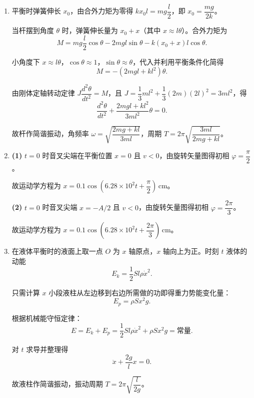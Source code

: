 \documentclass{article}
\begin{document}
\begin{enumerate}
联立以上方程，消去 $T_1$、$T_2$ 和 $\alpha$，利用平衡条件 $mg=kl$ 化简得
\[
\dfrac{d^2x}{dt^2}+\dfrac{k}{m+M/2}x=0.
\]

故系统作简谐振动，振动圆频率 $\omega=\sqrt{\dfrac{k}{m+M/2}}$。

\item 平衡时弹簧伸长 $x_0$，由合外力矩为零得 $kx_0 l=mg\dfrac{l}{2}$，即 $x_0=\dfrac{mg}{2k}$。

当杆摆到角度 $\theta$ 时，弹簧伸长量为 $x_0+x$（其中 $x\approx l\theta$）。合外力矩为
\[
M = mg\dfrac{l}{2}\cos\theta - 2mgl\sin\theta - k(x_0+x)l\cos\theta.
\]

小角度下 $x\approx l\theta$，$\cos\theta\approx 1$，$\sin\theta\approx\theta$，代入并利用平衡条件化简得
\[
M=-(2mgl+kl^2)\theta.
\]

由刚体定轴转动定律 $J\dfrac{d^2\theta}{dt^2}=M$，且 $J=\dfrac{1}{3}ml^2+\dfrac{1}{3}(2m)(2l)^2=3ml^2$，得
\[
\dfrac{d^2\theta}{dt^2}+\dfrac{2mgl+kl^2}{3ml^2}\theta=0.
\]

故杆作简谐振动，角频率 $\omega=\sqrt{\dfrac{2mg+kl}{3ml}}$，周期 $T=2\pi\sqrt{\dfrac{3ml}{2mg+kl}}$。

\item \textbf{(1)} $t=0$ 时音叉尖端在平衡位置 $x=0$ 且 $v<0$，由旋转矢量图得初相 $\varphi=\dfrac{\pi}{2}$。

故运动学方程为 $x=0.1\cos\left(6.28\times 10^2 t+\dfrac{\pi}{2}\right)\,\mathrm{cm}$。

\textbf{(2)} $t=0$ 时音叉尖端 $x=-A/2$ 且 $v<0$，由旋转矢量图得初相 $\varphi=\dfrac{2\pi}{3}$。

故运动学方程为 $x=0.1\cos\left(6.28\times 10^2 t+\dfrac{2\pi}{3}\right)\,\mathrm{cm}$。

\item 在液体平衡时的液面上取一点 $O$ 为 $x$ 轴原点，$x$ 轴向上为正。时刻 $t$ 液体的动能
\[
E_k=\dfrac{1}{2}Sl\rho \dot{x}^2.
\]

只需计算 $x$ 小段液柱从左边移到右边所需做的功即得重力势能变化量：
\[
E_p=\rho S x^2 g.
\]

根据机械能守恒定律：
\[
E=E_k+E_p=\dfrac{1}{2}Sl\rho\dot{x}^2+\rho Sx^2 g=\text{常量}.
\]

对 $t$ 求导并整理得
\[
\ddot{x}+\dfrac{2g}{l}x=0.
\]

故液柱作简谐振动，振动周期 $T=2\pi\sqrt{\dfrac{l}{2g}}$。

\end{enumerate}
\end{document}
